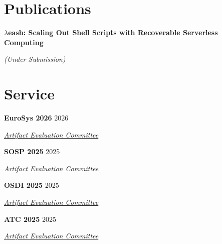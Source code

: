 \documentclass[margin,12pt]{resume}
\newcommand{\cvName}{Nikos Pagonas}
\newcommand{\subsectionVSpace}{\vspace{3.5ex}\xspace}
\newcommand{\sectionVSpace}{\vspace{1ex}\xspace} %
\newcommand{\sectionVSpaceCorrection}{\vspace{-3.5ex}} %
\newcommand{\header}[1]{\textbf{#1}\xspace}
\newcommand{\authors}[1]{#1\xspace}
\newcommand{\equalContributionNote}{(*equal contribution)\xspace}
\newcommand{\me}{\cvName\xspace}
\newcommand{\ordinal}[1]{\textsuperscript{#1}\xspace}
\newcommand{\paperTitle}[1]{\header{#1}\xspace}
\newcommand{\role}[1]{\textit{#1}\xspace}
\newcommand{\service}[1]{\header{#1}\xspace}
\newcommand{\underSubmission}{\textit{(Under Submission)}\xspace}
\newcommand{\venue}[1]{\textit{#1}\xspace}
\newenvironment{rSubsection}{}{\par\subsectionVSpace}
\newenvironment{rSection}[1]{\sectionVSpaceCorrection\section{#1}\xspace}{\sectionVSpace\par}
\begin{document}
\begin{resume}
\begin{rSection}{Publications}
\begin{rSubsection}
		\end{rSubsection}

		\begin{rSubsection}
			\paperTitle{\( \lambda \)eash: Scaling Out Shell Scripts with Recoverable Serverless Computing}

			\underSubmission


		\end{rSubsection}




	\end{rSection}

	\begin{rSection}{Service}
		\begin{rSubsection}
			\service{EuroSys 2026} \hfill 2026

			\role{\href{https://sysartifacts.github.io/eurosys2026/organizers}{Artifact Evaluation Committee}}
		\end{rSubsection}

		\begin{rSubsection}
			\service{SOSP 2025} \hfill 2025

			\role{Artifact Evaluation Committee}
		\end{rSubsection}

		\begin{rSubsection}
			\service{OSDI 2025} \hfill 2025

			\role{\href{https://www.usenix.org/conference/atc25}{Artifact Evaluation Committee}}
		\end{rSubsection}

		\begin{rSubsection}
			\service{ATC 2025} \hfill 2025

			\role{\href{https://www.usenix.org/conference/osdi25}{Artifact Evaluation Committee}}
		\end{rSubsection}


\end{rSection}
\end{resume}
\end{document}
